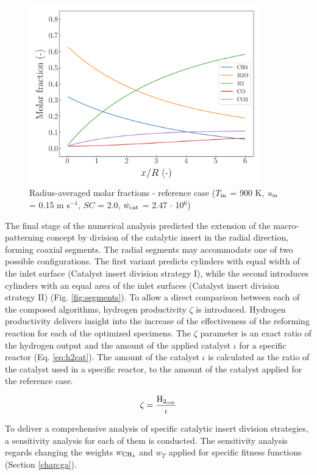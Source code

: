 \documentclass[preprint,12pt]{elsarticle}
\begin{document}
\begin{figure}[h]
\centering
\includegraphics[width=100mm]{ref-avg.png}
\caption{\label{fig:ref-avg} Radius-averaged molar fractions - reference case ($T_{\rm{in}}$ = 900 K, $u_{\rm{in}}$ = 0.15 m s$^{-1}$, $SC$ = 2.0, $\dot{w}_{\rm{cat}}$ = 2.47 $\cdot$ 10$^{6}$)}
\end{figure}

The final stage of the numerical analysis predicted the extension of the macro-patterning concept by division of the catalytic insert in the radial direction, forming coaxial segments. The radial segments may accommodate one of two possible configurations. The first variant predicts cylinders with equal width of the inlet surface (Catalyst insert division strategy I), while the second introduces cylinders with an equal area of the inlet surfaces (Catalyst insert division strategy II) (Fig. \ref{fig:segments}). To allow a direct comparison between each of the composed algorithms, hydrogen productivity $\zeta$ is introduced. Hydrogen productivity delivers insight into the increase of the effectiveness of the reforming reaction for each of the optimized specimens. The $\zeta$ parameter is an exact ratio of the hydrogen output and the amount of the applied catalyst $\iota$  for a specific reactor (Eq. \eqref{eq:h2cat}).  The amount of the catalyst $\iota$ is calculated as the ratio of the catalyst used in a specific reactor, to the amount of the catalyst applied for the reference case.
 
 \begin{equation}
 \label{eq:h2cat}
 \zeta = \frac{\rm{H_{2_{out}}}}{\iota}
  \end{equation}

To deliver a comprehensive analysis of specific catalytic insert division strategies, a sensitivity analysis for each of them is conducted. The sensitivity analysis regards changing the weights $w_{\rm{CH_4}}$ and $w_T$ applied for specific fitness functions (Section \ref{chap:ga}).
\end{document}

